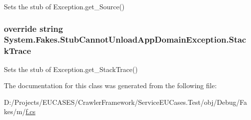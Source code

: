 Sets the stub of Exception.\-get\-\_\-\-Source()

\hypertarget{class_system_1_1_fakes_1_1_stub_cannot_unload_app_domain_exception_a34538ac1b0cb31e6137da428478badcb}{
\subsubsection[{Stack\-Trace}]{\setlength{\rightskip}{0pt plus 5cm}override string System.\-Fakes.\-Stub\-Cannot\-Unload\-App\-Domain\-Exception.\-Stack\-Trace\hspace{0.3cm}{\ttfamily [get]}}}\label{class_system_1_1_fakes_1_1_stub_cannot_unload_app_domain_exception_a34538ac1b0cb31e6137da428478badcb}


Sets the stub of Exception.\-get\-\_\-\-Stack\-Trace()



The documentation for this class was generated from the following file\-:\begin{DoxyCompactItemize}
\item 
D\-:/\-Projects/\-E\-U\-C\-A\-S\-E\-S/\-Crawler\-Framework/\-Service\-E\-U\-Cases.\-Test/obj/\-Debug/\-Fakes/m/\hyperlink{m_2f_8cs}{f.\-cs}\end{DoxyCompactItemize}
